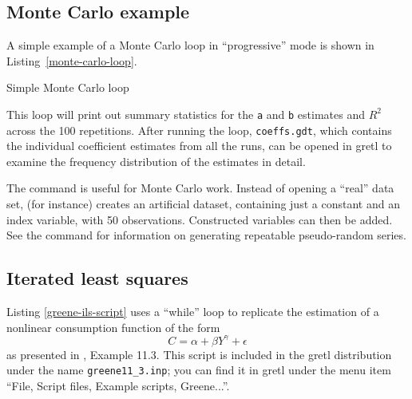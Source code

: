 \subsection{Monte Carlo example}
\label{loop-mc-example}

A simple example of a Monte Carlo loop in ``progressive'' mode is
shown in Listing~\ref{monte-carlo-loop}.

\begin{script}[htbp]
  \caption{Simple Monte Carlo loop}
  \label{monte-carlo-loop}
\scriptURL
\end{script}

This loop will print out summary statistics for the \texttt{a} and
\texttt{b} estimates and
$R^2$ across the 100 repetitions.  After running the loop,
\verb+coeffs.gdt+, which contains the individual coefficient estimates
from all the runs, can be opened in gretl to examine the frequency
distribution of the estimates in detail.

The  command is useful for Monte Carlo work.  Instead of
opening a ``real'' data set,  (for instance) creates
an artificial dataset, containing just a constant and an index
variable, with 50 observations. Constructed variables can then be
added.  See the  command for information on generating
repeatable pseudo-random series.

\subsection{Iterated least squares}
\label{loop-ils-examples}

Listing \ref{greene-ils-script} uses a ``while'' loop to replicate the
estimation of a nonlinear consumption function of the form
\[ C = \alpha + \beta Y^{\gamma} + \epsilon \]
as presented in \cite{greene00}, Example 11.3.  This script is included
in the gretl distribution under the name \verb+greene11_3.inp+;
you can find it in gretl under the menu item ``File, Script files,
Example scripts, Greene...''.

